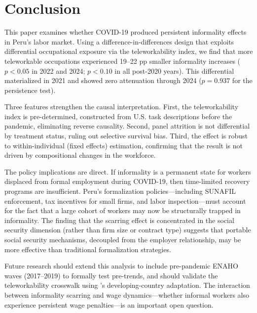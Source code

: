 \section{Conclusion}
\label{sec:conclusion}

This paper examines whether COVID-19 produced persistent informality effects in Peru's labor market. Using a difference-in-differences design that exploits differential occupational exposure via the \citet{dingel2020} teleworkability index, we find that more teleworkable occupations experienced 19--22 pp smaller informality increases ($p < 0.05$ in 2022 and 2024; $p < 0.10$ in all post-2020 years). This differential materialized in 2021 and showed zero attenuation through 2024 ($p = 0.937$ for the persistence test).

Three features strengthen the causal interpretation. First, the teleworkability index is pre-determined, constructed from U.S. task descriptions before the pandemic, eliminating reverse causality. Second, panel attrition is not differential by treatment status, ruling out selective survival bias. Third, the effect is robust to within-individual (fixed effects) estimation, confirming that the result is not driven by compositional changes in the workforce.

The policy implications are direct. If informality is a permanent state for workers displaced from formal employment during COVID-19, then time-limited recovery programs are insufficient. Peru's formalization policies---including SUNAFIL enforcement, tax incentives for small firms, and labor inspection---must account for the fact that a large cohort of workers may now be structurally trapped in informality. The finding that the scarring effect is concentrated in the social security dimension (rather than firm size or contract type) suggests that portable social security mechanisms, decoupled from the employer relationship, may be more effective than traditional formalization strategies.

Future research should extend this analysis to include pre-pandemic ENAHO waves (2017--2019) to formally test pre-trends, and should validate the teleworkability crosswalk using \citet{saltiel2020}'s developing-country adaptation. The interaction between informality scarring and wage dynamics---whether informal workers also experience persistent wage penalties---is an important open question.
